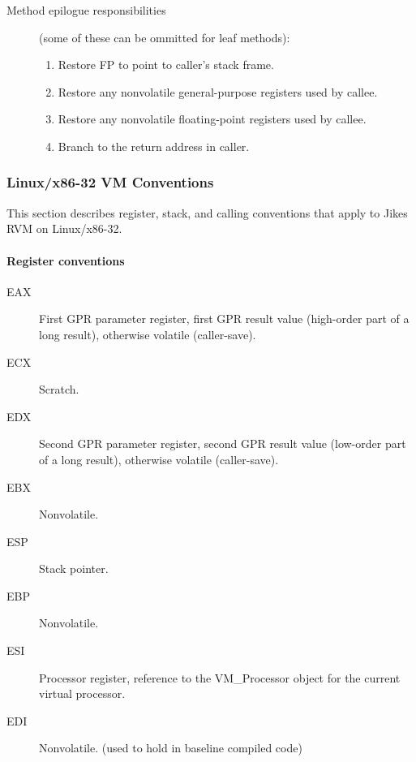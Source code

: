 \begin{description}
\item[Method epilogue responsibilities] (some of these can be
ommitted for leaf methods):

\begin{enumerate}
\item Restore FP to point to caller's stack frame.

\item Restore any nonvolatile general-purpose registers used by callee.

\item Restore any nonvolatile floating-point registers used by callee.

\item Branch to the return address in caller.
\end{enumerate}
\end{description}

\subsubsection{Linux/x86-32 VM Conventions} \label{lintel-conventions}

This section describes register, stack, and calling conventions that
apply to Jikes RVM on Li\-nux\Rweb{}\-/x86-32.  

\paragraph{Register conventions}

\begin{description}
\item[EAX]
    First GPR parameter register, first GPR result value (high-order part
    of a long result), otherwise volatile (caller-save).

\item[ECX]
    Scratch.

\item[EDX]
    Second GPR parameter register, second GPR result value (low-order part
    of a long result), otherwise volatile (caller-save).

\item[EBX]
    Nonvolatile.

\item[ESP]
    Stack pointer.

\item[EBP]
    Nonvolatile.

\item[ESI]
    Processor register, reference to the VM\_Processor object for the current
    virtual processor.

\item[EDI]
    Nonvolatile.  (used to hold  in baseline compiled code)

\end{description}

